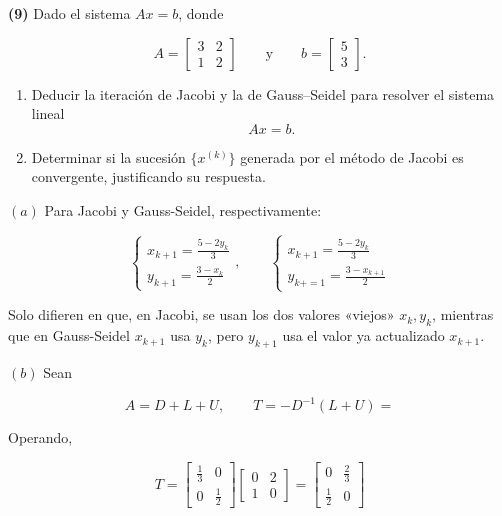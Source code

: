 \documentclass[12pt]{article}
\begin{document}
\begin{myframe}
\textbf{(9)} Dado el sistema $Ax=b$, donde

\[
A=
\begin{bmatrix}
3 & 2 \\
1 & 2
\end{bmatrix}
\qquad
\text{y}
\qquad
b=
\begin{bmatrix}
5 \\
3
\end{bmatrix}.
\]

\begin{enumerate}
\item[(a)] Deducir la iteración de Jacobi y la de Gauss--Seidel para resolver el sistema lineal
\[
Ax=b.
\]

\item[(b)] Determinar si la sucesión $\{x^{(k)}\}$ generada por el método de Jacobi es convergente,
justificando su respuesta.
\end{enumerate}
\end{myframe}

$(a)$ Para Jacobi y Gauss-Seidel, respectivamente:

\begin{equation*}
    \begin{cases}
    x_{k+1} = \frac{5-2y_k}{3} \\ 
    y_{k+1} = \frac{3 - x_k}{2}
    \end{cases}, \qquad \begin{cases}
    x_{k+1} = \frac{5-2y_k}{3} \\ 
    y_{k+=1} = \frac{3-x_{k+1}}{2}
    \end{cases}
\end{equation*}

Solo difieren en que, en Jacobi, se usan los dos valores «viejos» $x_k, y_k$,
mientras que en Gauss-Seidel $x_{k+1}$ usa $y_k$, pero $y_{k+1}$ usa el valor ya
actualizado $x_{k+1}$.

$(b)$ Sean

\begin{equation*}
    A = D + L + U, \qquad T = -D^{-1}(L+U) = 
\end{equation*}

Operando, 

\begin{equation*}
    T = 
    \begin{bmatrix} 
            \frac{1}{3} & 0 \\ 0 & \frac{1}{2} 
    \end{bmatrix} \begin{bmatrix} 
            0 & 2 \\ 
            1 & 0
    \end{bmatrix} = \begin{bmatrix} 
            0 & \frac{2}{3} \\ \frac{1}{2} & 0
    \end{bmatrix} 
\end{equation*}
\end{document}
